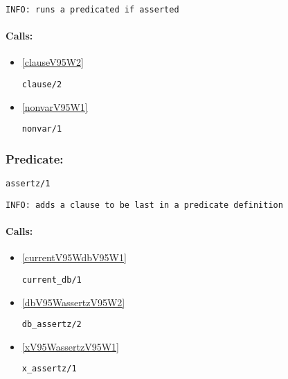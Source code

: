 {\small \begin{verbatim}
INFO: runs a predicated if asserted

\end{verbatim}}
\paragraph{Calls:} 
\begin{itemize}
\item \ref{clauseV95W2} 
\begin{verbatim}
clause/2
\end{verbatim}

\item \ref{nonvarV95W1} 
\begin{verbatim}
nonvar/1
\end{verbatim}

\end{itemize}

\subsubsection{Predicate:} \label{assertzV95W1}

\begin{verbatim}
assertz/1
\end{verbatim}

{\small \begin{verbatim}
INFO: adds a clause to be last in a predicate definition

\end{verbatim}}
\paragraph{Calls:} 
\begin{itemize}
\item \ref{currentV95WdbV95W1} 
\begin{verbatim}
current_db/1
\end{verbatim}

\item \ref{dbV95WassertzV95W2} 
\begin{verbatim}
db_assertz/2
\end{verbatim}

\item \ref{xV95WassertzV95W1} 
\begin{verbatim}
x_assertz/1
\end{verbatim}

\end{itemize}
